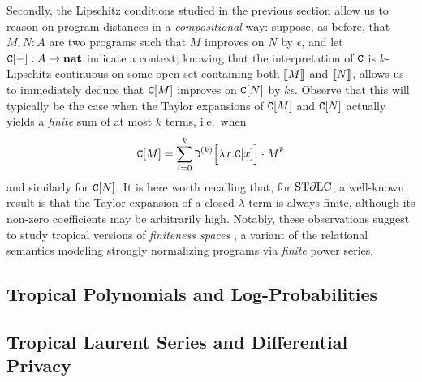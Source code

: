 Secondly, the Lipschitz conditions studied in the previous section allow us to reason on program distances in a \emph{compositional} way: suppose, as before, that $M,N:A$ are two programs such that $M$ improves on $N$ by $\epsilon$, and let $\mathtt{C}[-]:A \to \mathbf{nat}$ indicate a context; knowing that the interpretation of $\mathtt{C}$ is $k$-Lipschitz-continuous on some open set containing both $\llbracket M\rrbracket$ and $\llbracket N\rrbracket$, allows us to immediately deduce that $\mathtt{C}[M]$ improves on $\mathtt{C}[N]$ by $k \epsilon$. 
Observe that this will typically be the case when the Taylor expansions of $\mathtt{C}[M]$ and $\mathtt{C}[N]$ actually yields a \emph{finite} sum of at most $k$ terms, i.e.~when 
\begin{align}
\mathtt{C}[M] = \sum_{i=0}^{k} \mathtt{D}^{(k)}\Big[\lambda x.\mathtt{C}[x]\Big]\cdot M^{k}
\end{align}
and similarly for $\mathtt{C}[N]$. It is here worth recalling that, for $\mathrm{ST}\partial\mathrm{LC}$, a well-known result \cite{} is that the Taylor expansion of a closed $\lambda$-term is always finite, although its non-zero coefficients may be arbitrarily high. 
Notably, these observations suggest to study tropical versions of \emph{finiteness spaces} \cite{}, 
a variant of the relational semantics modeling strongly normalizing programs via \emph{finite} power series.





\subsection{Tropical Polynomials and Log-Probabilities}





\subsection{Tropical Laurent Series and Differential Privacy}


%
%
%
%
%
%
%
%
%



